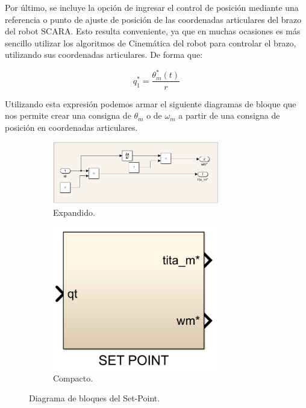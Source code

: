 \documentclass{article}
\begin{document}
Por último, se incluye la opción de ingresar el control de posición mediante una referencia o punto de 
ajuste de posición de las coordenadas articulares del brazo del robot SCARA. Esto resulta conveniente, ya que 
en muchas ocasiones es más sencillo utilizar los algoritmos de Cinemática del robot para controlar 
el brazo, utilizando sus coordenadas articulares. De forma que:

\begin{equation}
    q_1^* = \frac{\theta_m^*(t)}{r}
\end{equation}

Utilizando esta expresión podemos armar el siguiente diagramas de bloque que nos permite 
crear una consigna de $\theta_m$ o de $\omega_m$ a partir de una consigna de posición en coordenadas 
articulares.


\begin{figure}[H]
    \begin{subfigure}[b]{0.75\textwidth}
        \centering
        \includegraphics[width=0.8\textwidth]{set_point.png}
        \caption{Expandido.}
    \end{subfigure}
    \begin{subfigure}[b]{0.24\textwidth}
        \centering
        \includegraphics[width=0.8\textwidth]{set_point_comp.png}
        \caption{Compacto.}
    \end{subfigure}
    \caption{Diagrama de bloques del Set-Point.}
\end{figure}
\end{document}
